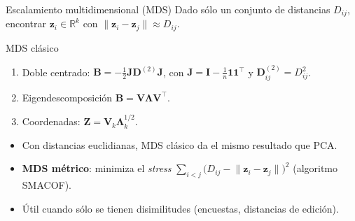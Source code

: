 \documentclass[aspectratio=169,11pt]{beamer}
\newcommand{\R}{\mathbb{R}}
\newcommand{\z}{\bm{z}}
\begin{document}
\begin{frame}{Escalamiento multidimensional (MDS)}
  Dado sólo un conjunto de distancias $D_{ij}$, encontrar $\z_i\in\R^k$ con
  $\lVert\z_i - \z_j\rVert \approx D_{ij}$.
  \begin{block}{MDS clásico}
    \begin{enumerate}
      \item Doble centrado: $\mathbf{B} = -\tfrac{1}{2}\mathbf{J}\mathbf{D}^{(2)}\mathbf{J}$,
            con $\mathbf{J} = \mathbf{I} - \tfrac{1}{n}\mathbf{1}\mathbf{1}^\top$ y
            $\mathbf{D}^{(2)}_{ij} = D_{ij}^2$.
      \item Eigendescomposición $\mathbf{B} = \mathbf{V}\boldsymbol{\Lambda}\mathbf{V}^\top$.
      \item Coordenadas: $\mathbf{Z} = \mathbf{V}_k\boldsymbol{\Lambda}_k^{1/2}$.
    \end{enumerate}
  \end{block}
  \begin{itemize}
    \item Con distancias euclidianas, MDS clásico da el mismo resultado que PCA.
    \item \textbf{MDS métrico}: minimiza el \emph{stress}
          $\sum_{i<j}\bigl(D_{ij} - \lVert\z_i-\z_j\rVert\bigr)^2$ (algoritmo SMACOF).
    \item Útil cuando sólo se tienen disimilitudes (encuestas, distancias de edición).
  \end{itemize}
\end{frame}
\end{document}
